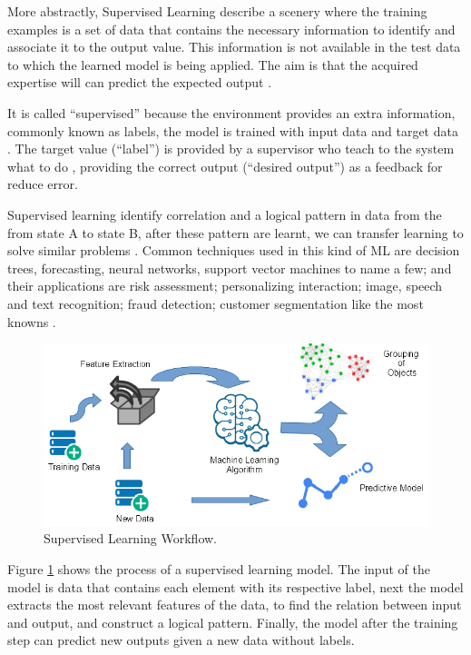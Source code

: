 \documentclass[12pt]{report}
\begin{document}
More abstractly, Supervised Learning describe a scenery where the training examples is a set of data that contains the necessary information to identify and associate it to the output value. This information is not available in the test data to which the learned model is being applied. The aim is that the acquired expertise will can predict the expected output \cite{Shai2014}.

It is called ``supervised'' because the environment provides an extra information, commonly known as labels, the model is trained with input data and target data \cite{Shai2014}. The target value (``label'') is provided by a supervisor who teach to the system what to do \cite{Goodfellow2016} , providing the correct output (``desired output'') as a feedback for reduce error.

Supervised learning identify correlation and a logical pattern in data from the from state A to state B, after these pattern are learnt, we can transfer learning to solve similar problems \cite{Nevala2017} \cite{Cer2018}. Common techniques used in this kind of \ac{ML} are decision trees, forecasting, neural networks, support vector machines to name a few; and their applications are risk assessment; personalizing interaction; image, speech and text recognition; fraud detection; customer segmentation like the most knowns \cite{Nevala2017}.

\begin{figure}[H]	
	\centering	
	\includegraphics[width=150mm, scale = 1]{images/1_Supervised.png}
	\caption{Supervised Learning Workflow.}
	\label{figure:Supervised_Learning}
\end{figure}

Figure \ref{figure:Supervised_Learning} shows the process of a supervised learning model. The input of the model is data that contains each element with its respective label, next the model extracts the most relevant features of the data, to find the relation between input and output, and construct a logical pattern. Finally, the model after the training step can predict new outputs given a new data without labels.
\end{document}
